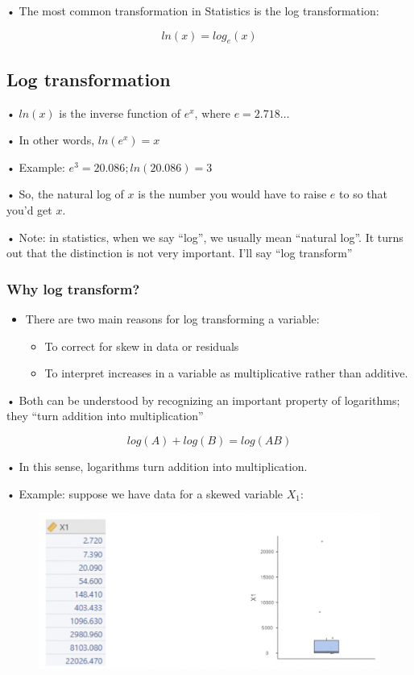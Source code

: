 \documentclass[
  letterpaper,
  DIV=11,
  numbers=noendperiod]{scrreprt}
\begin{document}
• The most common transformation in Statistics is the log
transformation:

\[
ln(x) = log_e(x)
\]

\hypertarget{log-transformation}{%
\subsection{Log transformation}\label{log-transformation}}

• \(ln(𝑥)\) is the inverse function of \(e^𝑥\), where
\(𝑒 = 2.718 \dots\)

• In other words, \(ln(e^x) = x\)

• Example: \(𝑒^3 = 20.086; ln(20.086) = 3\)

• So, the natural log of \(x\) is the number you would have to raise
\(e\) to so that you'd get \(x\).

• Note: in statistics, when we say ``log'', we usually mean ``natural
log''. It turns out that the distinction is not very important. I'll say
``log transform''

\hypertarget{why-log-transform}{%
\subsubsection{Why log transform?}\label{why-log-transform}}

\begin{itemize}
\item
  There are two main reasons for log transforming a variable:

  \begin{itemize}
  \item
    To correct for skew in data or residuals
  \item
    To interpret increases in a variable as multiplicative rather than
    additive.
  \end{itemize}
\end{itemize}

• Both can be understood by recognizing an important property of
logarithms; they ``turn addition into multiplication''

\[
log(𝐴) + log(𝐵) = log(𝐴𝐵)
\]

• In this sense, logarithms turn addition into multiplication.

• Example: suppose we have data for a skewed variable \(X_1\):

\begin{figure}

{\centering \includegraphics{images/mod4_pt2_1.png}

}

\end{figure}
\end{document}
